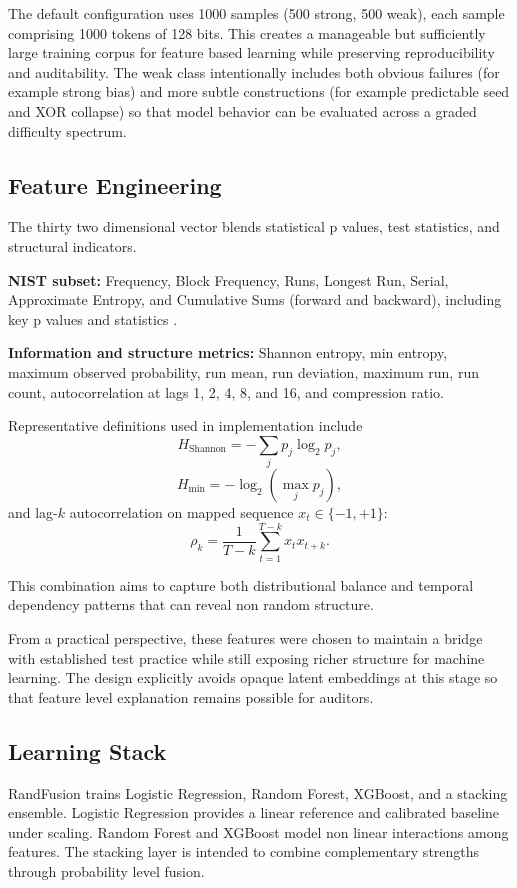 \documentclass[conference]{IEEEtran}
\begin{document}
The default configuration uses 1000 samples (500 strong, 500 weak), each sample comprising 1000 tokens of 128 bits. This creates a manageable but sufficiently large training corpus for feature based learning while preserving reproducibility and auditability. The weak class intentionally includes both obvious failures (for example strong bias) and more subtle constructions (for example predictable seed and XOR collapse) so that model behavior can be evaluated across a graded difficulty spectrum.

\subsection{Feature Engineering}
The thirty two dimensional vector blends statistical p values, test statistics, and structural indicators.

\textbf{NIST subset:} Frequency, Block Frequency, Runs, Longest Run, Serial, Approximate Entropy, and Cumulative Sums (forward and backward), including key p values and statistics \cite{b1}.

\textbf{Information and structure metrics:} Shannon entropy, min entropy, maximum observed probability, run mean, run deviation, maximum run, run count, autocorrelation at lags 1, 2, 4, 8, and 16, and compression ratio.

Representative definitions used in implementation include
\begin{equation}
H_{\text{Shannon}} = -\sum_{j} p_j \log_2 p_j,
\end{equation}
\begin{equation}
H_{\text{min}} = -\log_2\left(\max_j p_j\right),
\end{equation}
and lag-$k$ autocorrelation on mapped sequence $x_t \in \{-1,+1\}$:
\begin{equation}
\rho_k = \frac{1}{T-k}\sum_{t=1}^{T-k}x_t x_{t+k}.
\end{equation}

This combination aims to capture both distributional balance and temporal dependency patterns that can reveal non random structure.

From a practical perspective, these features were chosen to maintain a bridge with established test practice \cite{b1} while still exposing richer structure for machine learning. The design explicitly avoids opaque latent embeddings at this stage so that feature level explanation remains possible for auditors.

\subsection{Learning Stack}
RandFusion trains Logistic Regression, Random Forest, XGBoost, and a stacking ensemble. Logistic Regression provides a linear reference and calibrated baseline under scaling. Random Forest and XGBoost model non linear interactions among features. The stacking layer is intended to combine complementary strengths through probability level fusion.
\end{document}
